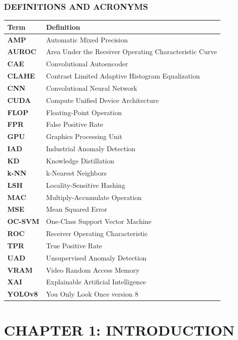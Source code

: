 \documentclass[12pt, a4paper, oneside]{report}
\begin{document}
\subsection{DEFINITIONS AND ACRONYMS}\label{definitions-and-acronyms}

{\def\LTcaptype{none} %
\begin{longtable}[]{@{}ll@{}}
\toprule\noalign{}
Term & Definition \\
\midrule\noalign{}
\endhead
\bottomrule\noalign{}
\endlastfoot
\textbf{AMP} & Automatic Mixed Precision \\
\textbf{AUROC} & Area Under the Receiver Operating Characteristic Curve \\
\textbf{CAE} & Convolutional Autoencoder \\
\textbf{CLAHE} & Contrast Limited Adaptive Histogram Equalization \\
\textbf{CNN} & Convolutional Neural Network \\
\textbf{CUDA} & Compute Unified Device Architecture \\
\textbf{FLOP} & Floating-Point Operation \\
\textbf{FPR} & False Positive Rate \\
\textbf{GPU} & Graphics Processing Unit \\
\textbf{IAD} & Industrial Anomaly Detection \\
\textbf{KD} & Knowledge Distillation \\
\textbf{k-NN} & k-Nearest Neighbors \\
\textbf{LSH} & Locality-Sensitive Hashing \\
\textbf{MAC} & Multiply-Accumulate Operation \\
\textbf{MSE} & Mean Squared Error \\
\textbf{OC-SVM} & One-Class Support Vector Machine \\
\textbf{ROC} & Receiver Operating Characteristic \\
\textbf{TPR} & True Positive Rate \\
\textbf{UAD} & Unsupervised Anomaly Detection \\
\textbf{VRAM} & Video Random Access Memory \\
\textbf{XAI} & Explainable Artificial Intelligence \\
\textbf{YOLOv8} & You Only Look Once version 8 \\
\end{longtable}
}

\chapter{CHAPTER 1: INTRODUCTION}\label{chapter-1-introduction}
\end{document}
